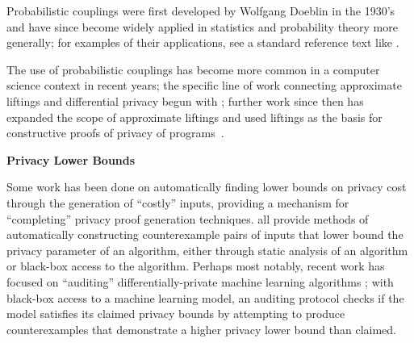 Probabilistic couplings were first developed by Wolfgang Doeblin in the 1930's and have since become widely applied in statistics and probability theory more generally; for examples of their applications, see a standard reference text like \cite{lindvallLecturesCouplingMethod2002}. 

The use of probabilistic couplings has become more common in a computer science context in recent years; the specific line of work connecting approximate liftings and differential privacy begun with \cite{bartheProvingDifferentialPrivacy2016}; 
further work since then has expanded the scope of approximate liftings \cite{bartheRelationalStarLiftings2019,hsuProbabilisticCouplingsProbabilistic2017} and used liftings as the basis for constructive proofs of privacy of programs~\cite{albarghouthiSynthesizingCouplingProofs2017,albarghouthiConstraintBasedSynthesisCoupling2018}.


\textbf{Privacy Lower Bounds}

Some work has been done on automatically finding lower bounds on privacy cost through the generation of ``costly'' inputs, providing a mechanism for ``completing'' privacy proof generation techniques. 
\cite{bichselDPFinderFindingDifferential2018,bichselDPSniperBlackBoxDiscovery2021,dingDetectingViolationsDifferential2018,niuDPOptIdentifyHigh2022} all provide methods of automatically constructing counterexample pairs of inputs that lower bound the privacy parameter of an algorithm, either through static analysis of an algorithm or black-box access to the algorithm. 
Perhaps most notably, recent work has focused on ``auditing'' differentially-private machine learning algorithms \cite{luGeneralFrameworkAuditing2022,loknaGroupAttackAuditing2023,loknaGroupAttackAuditing2023,steinkePrivacyAuditingOne2023}; with black-box access to a machine learning model, an auditing protocol checks if the model satisfies its claimed privacy bounds by attempting to produce counterexamples that demonstrate a higher privacy lower bound than claimed. 